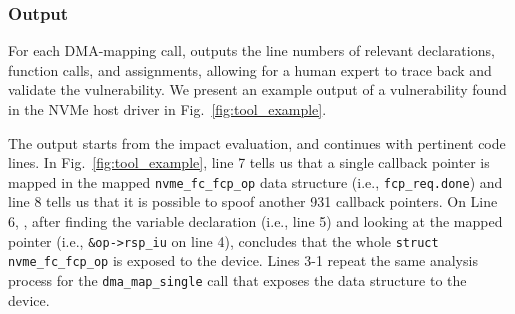 
\subsubsection{Output}
%
For each DMA-mapping call, \tool outputs the line numbers of relevant declarations, function calls, and assignments, allowing for a human expert to trace back and validate the vulnerability. We present an example output of a vulnerability found in the NVMe host driver in Fig.~\ref{fig:tool_example}.

The output starts from the impact evaluation, and continues with pertinent code lines. %
In Fig.~\ref{fig:tool_example}, line 7 tells us that a single callback pointer is mapped in the mapped \texttt{nvme\_fc\_fcp\_op} data structure (i.e., \texttt{fcp\_req.done}) and line 8 tells us that it is possible to spoof another 931 callback pointers.
On Line 6, \tool, after finding the variable declaration (i.e., line 5) and looking at the mapped pointer (i.e., \texttt{\&op->rsp\_iu} on line 4), concludes that the whole \texttt{struct nvme\_fc\_fcp\_op} is exposed to the device. Lines 3-1 repeat the same analysis process for the \texttt{dma\_map\_single} call that exposes the data structure to the device. 

